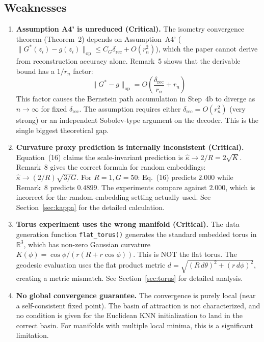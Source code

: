\documentclass{article}
\DeclareMathOperator{\op}{op}
\newcommand{\RR}{\mathbb{R}}
\begin{document}
\subsection{Weaknesses}

\begin{enumerate}[label=\textbf{W\arabic*.}]
    \item \textbf{Assumption A4' is unreduced (Critical).}
      The isometry convergence theorem (Theorem~2) depends on Assumption~A4'
      ($\|G^*(z_i) - g(z_i)\|_{\op} \leq C_G \delta_{\mathrm{rec}} + O(r_n^2)$),
      which the paper cannot derive from reconstruction accuracy alone.
      Remark~5 shows that the derivable bound has a $1/r_n$ factor:
      \[
          \|G^* - g\|_{\op} = O\!\left(\frac{\delta_{\mathrm{rec}}}{r_n} + r_n\right)
      \]
      This factor causes the Bernstein path accumulation in Step~4b to
      diverge as $n \to \infty$ for fixed $\delta_{\mathrm{rec}}$.
      The assumption requires either $\delta_{\mathrm{rec}} = O(r_n^2)$
      (very strong) or an independent Sobolev-type argument on the decoder.
      This is the single biggest theoretical gap.

    \item \textbf{Curvature proxy prediction is internally inconsistent (Critical).}
      Equation~(16) claims the scale-invariant prediction is
      $\hat{\kappa} \to 2/R = 2\sqrt{K}$. Remark~8 gives the correct formula
      for random embeddings: $\hat{\kappa} \to (2/R)\sqrt{3/G}$. For
      $R=1, G=50$: Eq.~(16) predicts $2.000$ while Remark~8 predicts
      $0.4899$. The experiments compare against $2.000$, which is incorrect
      for the random-embedding setting actually used. See Section~\ref{sec:kappa}
      for the detailed calculation.

    \item \textbf{Torus experiment uses the wrong manifold (Critical).}
      The data generation function \texttt{flat\_torus()} generates the
      standard embedded torus in $\RR^3$, which has non-zero Gaussian
      curvature $K(\phi) = \cos\phi / (r(R + r\cos\phi))$. This is NOT the
      flat torus. The geodesic evaluation uses the flat product metric
      $d = \sqrt{(R\,d\theta)^2 + (r\,d\phi)^2}$, creating a metric mismatch.
      See Section~\ref{sec:torus} for detailed analysis.

    \item \textbf{No global convergence guarantee.} The convergence is purely
      local (near a self-consistent fixed point). The basin of attraction is
      not characterized, and no condition is given for the Euclidean KNN
      initialization to land in the correct basin. For manifolds with multiple
      local minima, this is a significant limitation.


\end{enumerate}
\end{document}
